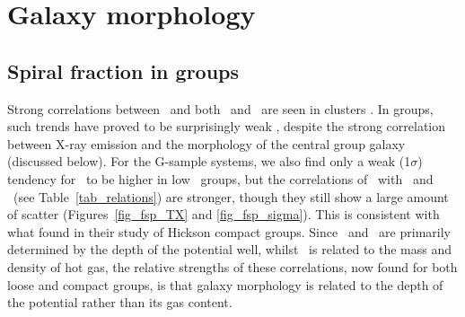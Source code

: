 \documentclass[usenatbib]{mn2e}
\begin{document}

\section{Galaxy morphology}
\label{sec_morph}

\subsection{Spiral fraction in groups}
\label{subsec_fsp}

Strong correlations between \fsp\ and both \LX\ and \TX\ are seen in clusters
\citep{edge91b}. In groups, such trends have proved to be surprisingly weak
\citep{ponman96,mulchaey00,helsdon03b}, despite the strong correlation between
X-ray emission and the morphology of the central group galaxy (discussed below).
For the G-sample systems, we also find only a weak (1$\sigma$) tendency for \fsp\
to be higher in low \LX\ groups, but the correlations of \fsp\ with \TX\ and
\sigmav\ (see Table~\ref{tab_relations}) are stronger, though they still show a
large amount of scatter (Figures~\ref{fig_fsp_TX} and \ref{fig_fsp_sigma}).  This
is consistent with what \citet{ponman96} found in their study of Hickson compact
groups.  Since \TX\ and \sigmav\ are primarily determined by the depth of the
potential well, whilst \LX\ is related to the mass and density of hot gas, the
relative strengths of these correlations, now found for both loose and compact
groups, is that galaxy morphology is related to the depth of the potential rather
than its gas content.
\end{document}

